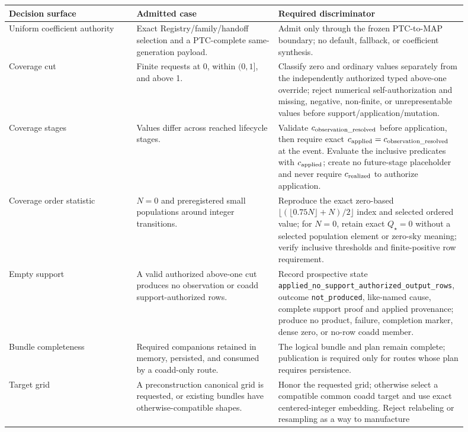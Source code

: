 \documentclass[10pt]{article}
\newcommand{\code}[1]{\nolinkurl{#1}}
\begin{document}
\begin{longtable}{L{0.27\linewidth}L{0.30\linewidth}L{0.33\linewidth}}
\toprule
Decision surface & Admitted case & Required discriminator\\
\midrule
Uniform coefficient authority & Exact Registry/family/handoff selection and a
PTC-complete same-generation payload. & Admit only through the frozen
PTC-to-MAP boundary; no default, fallback, or coefficient synthesis.\\
Coverage cut & Finite requests at 0, within \((0,1]\), and above 1. & Classify
zero and ordinary values separately from the independently authorized typed
above-one override; reject numerical self-authorization and missing, negative,
non-finite, or unrepresentable values before support/application/mutation.\\
Coverage stages & Values differ across reached lifecycle stages. & Validate
\(c_{\rm observation\_resolved}\) before application, then require exact
\(c_{\rm applied}=c_{\rm observation\_resolved}\) at the event. Evaluate the
inclusive predicates with \(c_{\rm applied}\); create no future-stage
placeholder and never require \(c_{\rm realized}\) to authorize application.\\
Coverage order statistic & \(N=0\) and preregistered small populations around
integer transitions. & Reproduce the exact zero-based
\(\lfloor(\lfloor0.75N\rfloor+N)/2\rfloor\) index and selected ordered value;
for \(N=0\), retain exact \(Q_\star=0\) without a selected population element
or zero-sky meaning; verify inclusive thresholds and finite-positive row
requirement.\\
Empty support & A valid authorized above-one cut produces no observation or
coadd support-authorized rows. & Record prospective state
\code{applied_no_support_authorized_output_rows}, outcome \code{not_produced},
like-named cause, complete support proof and applied provenance; produce no
product, failure, completion marker, dense zero, or no-row coadd member.\\
Bundle completeness & Required companions retained in memory, persisted, and
consumed by a coadd-only route. & The logical bundle and plan remain complete;
publication is required only for routes whose plan requires persistence.\\
Target grid & A preconstruction canonical grid is requested, or existing
bundles have otherwise-compatible shapes. & Honor the requested grid; otherwise
select a compatible common coadd target and use exact centered-integer
embedding.  Reject relabeling or resampling as a way to manufacture

\end{longtable}
\end{document}
